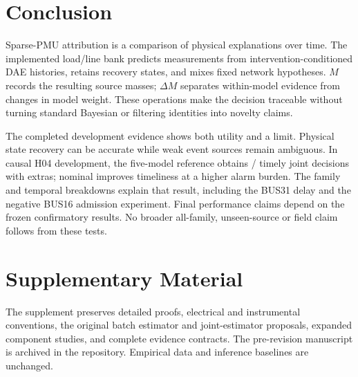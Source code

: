 \section{Conclusion}
\label{sec:conclusion}

Sparse-PMU attribution is a comparison of physical explanations over time. The implemented load/line bank predicts measurements from intervention-conditioned DAE histories, retains recovery states, and mixes fixed network hypotheses. $M$ records the resulting source masses; $\Delta M$ separates within-model evidence from changes in model weight. These operations make the decision traceable without turning standard Bayesian or filtering identities into novelty claims.

The completed development evidence shows both utility and a limit. Physical state recovery can be accurate while weak event sources remain ambiguous. In causal H04 development, the five-model reference obtains \ContMixTimely{}/\ContMixTotal{} timely joint decisions with \ContMixExtras{} extras; nominal improves timeliness at a higher alarm burden. The family and temporal breakdowns explain that result, including the BUS31 delay and the negative BUS16 admission experiment. Final performance claims depend on the frozen confirmatory results. No broader all-family, unseen-source or field claim follows from these tests.

\section*{Supplementary Material}
The supplement preserves detailed proofs, electrical and instrumental conventions, the original batch estimator and joint-estimator proposals, expanded component studies, and complete evidence contracts. The pre-revision manuscript is archived in the repository. Empirical data and inference baselines are unchanged.
